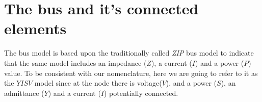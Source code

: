 \documentclass[nols,a4paper,twoside,notoc,fleqn]{tufte-book}
\begin{document}
%


\newpage
\section{The bus and it's connected elements}

The bus model is based upon the traditionally called \textit{ZIP} bus model to indicate that the same model includes an impedance ($Z$), a current ($I$) and a power ($P$) value. To be consistent with our nomenclature, here we are going to refer to it as the $YISV$ model since at the node there is voltage($V$), and a power ($S$), an admittance ($Y$) and a current ($I$) potentially connected.
\end{document}
